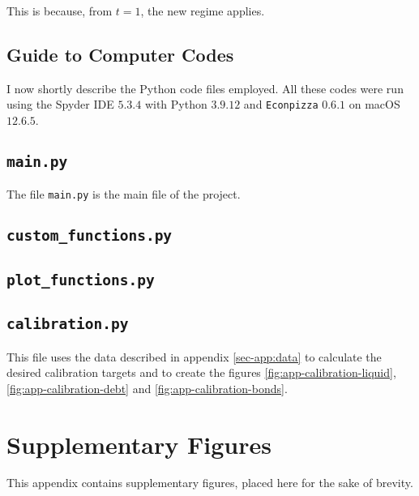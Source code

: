 \documentclass[12pt]{article} %
\numberwithin{equation}{section} %
\numberwithin{figure}{section}
\numberwithin{table}{section}
\begin{document}
\begin{refsection}
\begin{appendices}
This is because, from $t=1$, the new regime applies.

\subsection{Guide to Computer Codes}
\label{sec-app:codes-guide}

I now shortly describe the Python code files employed. All these codes were run using the Spyder IDE $5.3.4$ with Python $3.9.12$ and \texttt{Econpizza} $0.6.1$ on macOS $12.6.5$.

\subsection*{\texttt{main.py}}

The file \texttt{main.py} is the main file of the project.

\subsection*{\texttt{custom\_functions.py}}

\subsection*{\texttt{plot\_functions.py}}

\subsection*{\texttt{calibration.py}}

This file uses the data described in appendix \ref{sec-app:data} to calculate the desired calibration targets and to create the figures \ref{fig:app-calibration-liquid}, \ref{fig:app-calibration-debt} and \ref{fig:app-calibration-bonds}.

\thispagestyle{plain}
\section{Supplementary Figures}
\label{sec-app:figures}

This appendix contains supplementary figures, placed here for the sake of brevity.


\end{appendices}
\end{refsection}
\end{document}
